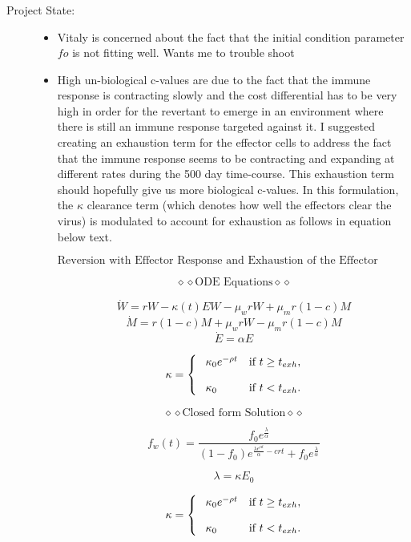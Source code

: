 \documentclass[letterpaper,index=totoc,hyperref,openany]{labbook} %
\newcommand{\researcher}{\subsubsection}
\begin{document}
\researcher{}
\begin{description}
  \item[Project State:]
    \begin{itemize}
    
    \item{Vitaly is concerned about the fact that the initial condition parameter $fo$ is not fitting well. Wants me to trouble shoot}
    \item{High un-biological c-values are due to the fact that the immune response is contracting slowly and the cost differential has to be very high in order for 	the revertant to emerge in an environment where there is still an immune response targeted against it. I suggested creating an exhaustion term for the effector cells to address the fact that the immune response seems to be contracting and expanding at different rates during the 500 day time-course. This exhaustion term should hopefully give us more biological c-values. In this formulation,
	the $\kappa$ clearance term (which denotes how well the effectors clear the virus) is modulated to account for exhaustion as follows in equation below text.}
	
$$\text{Reversion with Effector Response and Exhaustion of the Effector Response}$$


$$\diamond\diamond\text{ODE Equations}\diamond\diamond$$

$$\dot W=  rW- \kappa(t) E W -\mu_w rW + \mu_m r(1-c)M $$
$$\dot M = r(1-c)M  +\mu_w rW -\mu_m r(1-c)M $$
$$\dot E =\alpha E$$




$$\kappa=
\begin{cases}
\hphantom{-}\kappa_0 e^{-\rho t} &\text{if $t \geq t_{exh}$},\\[2ex]
\hphantom{-}\kappa_0  &\text{if $ t< t_{exh}$}.
\end{cases}$$



$$\diamond \diamond \text{Closed form Solution}\diamond \diamond$$

$$f_w(t)=\dfrac{f_0 e^{\frac{\lambda}{\alpha}} } {(1-f_0) e^{\frac{\lambda e^{\alpha t}}{\alpha}-crt}+ f_0 e^{ \frac{\lambda}{\alpha}} }$$

$$\lambda=\kappa E_0$$

$$\kappa=
\begin{cases}
\hphantom{-}\kappa_0 e^{-\rho t} &\text{if $t \geq t_{exh}$},\\[2ex]
\hphantom{-}\kappa_0  &\text{if $t < t_{exh}$}.
\end{cases}$$



\end{itemize}
\end{description}
\end{document}
